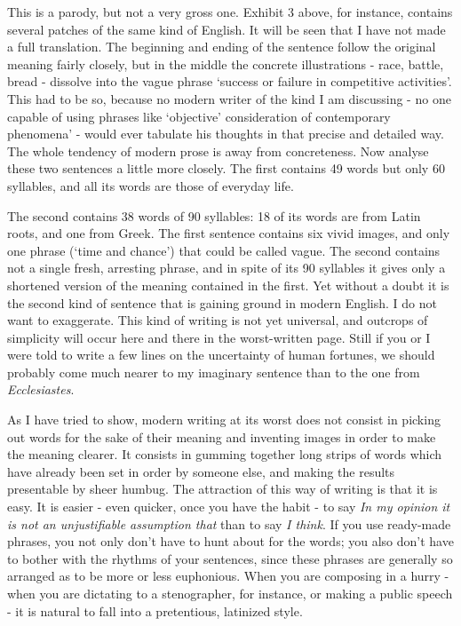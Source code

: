 This is a parody, but not a very gross one. Exhibit 3 above, for instance, contains several patches of the same kind of English. It will be seen that I have not made a full translation. The beginning and ending of the sentence follow the original meaning fairly closely, but in the middle the concrete illustrations - race, battle, bread - dissolve into the vague phrase ‘success or failure in competitive activities’. This had to be so, because no modern writer of the kind I am discussing - no one capable of using phrases like ‘objective’ consideration of contemporary phenomena’ - would ever tabulate his thoughts in that precise and detailed way. The whole tendency of modern prose is away from concreteness. Now analyse these two sentences a little more closely. The first contains 49 words but only 60 syllables, and all its words are those of everyday life.\par

The second contains 38 words of 90 syllables: 18 of its words are from Latin roots, and one from Greek. The first sentence contains six vivid images, and only one phrase (‘time and chance’) that could be called vague. The second contains not a single fresh, arresting phrase, and in spite of its 90 syllables it gives only a shortened version of the meaning contained in the first. Yet without a doubt it is the second kind of sentence that is gaining ground in modern English. I do not want to exaggerate. This kind of writing is not yet universal, and outcrops of simplicity will occur here and there in the worst-written page. Still if you or I were told to write a few lines on the uncertainty of human fortunes, we should probably come much nearer to my imaginary sentence than to the one from \textit{Ecclesiastes}.\par

As I have tried to show, modern writing at its worst does not consist in picking out words for the sake of their meaning and inventing images in order to make the meaning clearer. It consists in gumming together long strips of words which have already been set in order by someone else, and making the results presentable by sheer humbug. The attraction of this way of writing is that it is easy. It is easier - even quicker, once you have the habit - to say \textit{In my opinion it is not an unjustifiable assumption that} than to say \textit{I think}. If you use ready-made phrases, you not only don’t have to hunt about for the words; you also don’t have to bother with the rhythms of your sentences, since these phrases are generally so arranged as to be more or less euphonious. When you are composing in a hurry - when you are dictating to a stenographer, for instance, or making a public speech - it is natural to fall into a pretentious, latinized style.\par

